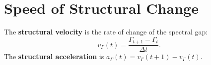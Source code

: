 \documentclass[../structural_economics_book.tex]{subfiles}
\begin{document}
\section{Speed of Structural Change}
\label{ch23:sec:speed}

\begin{definition}\label{ch23:def:velocity}
The \textbf{structural velocity} is the rate of change of the spectral gap:
\begin{equation}\label{ch23:eq:velocity}
v_\Gamma(t) = \frac{\Gamma_{t+1} - \Gamma_t}{\Delta t}.
\end{equation}
The \textbf{structural acceleration} is $a_\Gamma(t) = v_\Gamma(t+1) - v_\Gamma(t)$.
\end{definition}
\end{document}
